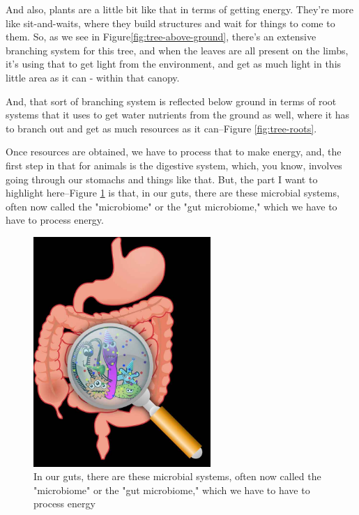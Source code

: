 \documentclass[]{article}
\begin{document}
\begin{figure}[H]
\begin{subfigure}[t]{0.3\textwidth}
	\end{subfigure}
\end{figure}

And also, plants are a little bit
like that
in terms of getting energy.
They're more like sit-and-waits,
where they build structures
and wait for things to come to them.
So, as we see in Figure\ref{fig:tree-above-ground}, there's an extensive
branching system for this tree,
and when the leaves are all present
on the limbs,
it's using that to get light from the environment,
and get as much light in this little area
as it can - within that canopy.

And, that sort of branching system
is reflected below ground
in terms of root systems
that it uses to get water nutrients
from the ground as well,
where it has to branch out
and get as much resources as it can--Figure \ref{fig:tree-roots}.

Once resources are obtained,
we have to process that to make energy,
and, the first step in that for animals
is the digestive system,
which, you know, involves 
going through our stomachs
and things like that.
But, the part I want to highlight here--Figure \ref{fig:digestion}
is that, in our guts,
there are these microbial systems,
often now called the "microbiome"
or the "gut microbiome,"
which we have to have
to process energy.

\begin{figure}[H]
	\begin{center}
		\caption[The gut microbiome]{In our guts, there are these microbial systems, often now called the "microbiome" or the "gut microbiome," which we have to have to process energy}\label{fig:digestion}
		\includegraphics[width=0.6\textwidth]{digestion}
	\end{center}
\end{figure}
\end{document}
